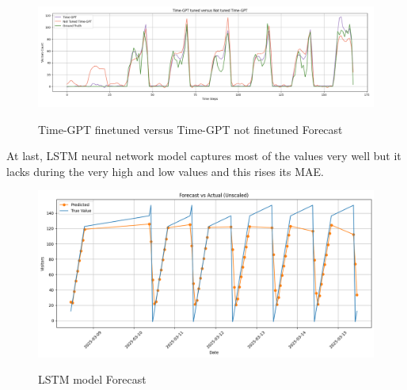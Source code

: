 \documentclass{article}
\begin{document}
\begin{figure}[h]
\includegraphics[width=1\linewidth]{images/TimeGPT_Tuned_and_Not_Forecast.png}
    \label{fig:mesh1}
    \caption{Time-GPT finetuned versus Time-GPT not finetuned Forecast}
\end{figure}

At last, LSTM neural network model captures most of the values very well but it lacks during the very high and low values and this rises its MAE.

\begin{figure}[h]
\includegraphics[width=1\linewidth]{images/neural_forecast.png}
    \label{fig:mesh1}
    \caption{LSTM model Forecast}
\end{figure}
\newpage
\end{document}
